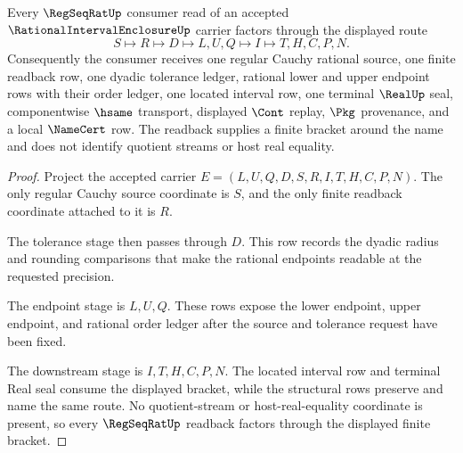 \begin{theorem}
\label{thm:rational-interval-enclosure-regseqrat-readback}
Every $\RegSeqRatUp$ consumer read of an accepted $\RationalIntervalEnclosureUp$ carrier factors through the displayed route
$$
S \longmapsto R \longmapsto D \longmapsto L,U,Q \longmapsto I \longmapsto T,H,C,P,N .
$$
Consequently the consumer receives one regular Cauchy rational source, one finite readback row, one dyadic tolerance ledger, rational lower and upper endpoint rows with their order ledger, one located interval row, one terminal $\RealUp$ seal, componentwise $\hsame$ transport, displayed $\Cont$ replay, $\Pkg$ provenance, and a local $\NameCert$ row. The readback supplies a finite bracket around the name and does not identify quotient streams or host real equality.
\end{theorem}
\begin{proof}
Project the accepted carrier $E=(L,U,Q,D,S,R,I,T,H,C,P,N)$. The only regular Cauchy source coordinate is $S$, and the only finite readback coordinate attached to it is $R$.

The tolerance stage then passes through $D$. This row records the dyadic radius and rounding comparisons that make the rational endpoints readable at the requested precision.

The endpoint stage is $L,U,Q$. These rows expose the lower endpoint, upper endpoint, and rational order ledger after the source and tolerance request have been fixed.

The downstream stage is $I,T,H,C,P,N$. The located interval row and terminal Real seal consume the displayed bracket, while the structural rows preserve and name the same route. No quotient-stream or host-real-equality coordinate is present, so every $\RegSeqRatUp$ readback factors through the displayed finite bracket.
\end{proof}

